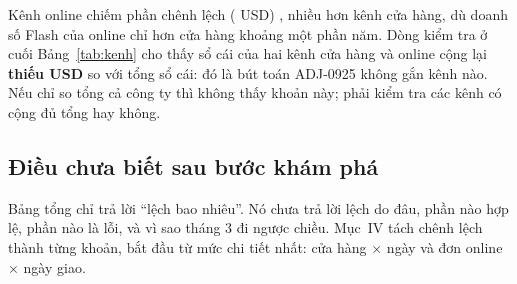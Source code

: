 Kênh online chiếm \SoOnlineTyTrong{} phần chênh lệch (\SoOnlineChenhLech{} USD) , nhiều hơn kênh cửa hàng, dù doanh số Flash của online chỉ hơn cửa hàng khoảng một phần năm. Dòng kiểm tra ở cuối Bảng~\ref{tab:kenh} cho thấy sổ cái của hai kênh cửa hàng và online cộng lại \textbf{thiếu \SoChuaGanKenh{} USD} so với tổng sổ cái: đó là bút toán ADJ-0925 không gắn kênh nào. Nếu chỉ so tổng cả công ty thì không thấy khoản này; phải kiểm tra các kênh có cộng đủ tổng hay không.

\subsection{Điều chưa biết sau bước khám phá}

Bảng tổng chỉ trả lời ``lệch bao nhiêu''. Nó chưa trả lời lệch do đâu, phần nào hợp lệ, phần nào là lỗi, và vì sao tháng 3 đi ngược chiều. Mục~IV tách chênh lệch thành từng khoản, bắt đầu từ mức chi tiết nhất: cửa hàng $\times$ ngày và đơn online $\times$ ngày giao.
